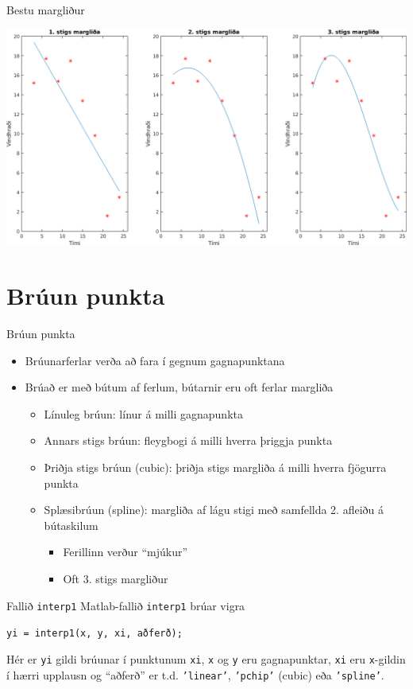 \documentclass[handout]{beamer}
\begin{document}
\begin{frame}[fragile]{Bestu margliður}
\begin{center}
\includegraphics[height=0.6\textheight]{Pics/poly-subplot}
\end{center}
\end{frame}


\section{Brúun punkta}

\begin{frame}[fragile]{Brúun punkta}
\begin{itemize}
 \item Brúunarferlar verða að fara í gegnum gagnapunktana
 \item Brúað er með bútum af ferlum, bútarnir eru oft ferlar margliða
 \begin{itemize}
  \item Línuleg brúun: línur á milli gagnapunkta
  \item Annars stigs brúun:  fleygbogi á milli hverra þriggja punkta
  \item Þriðja stigs brúun (cubic):  þriðja stigs margliða á milli hverra fjögurra punkta
  \item Splæsibrúun (spline): margliða af lágu stigi með samfellda 2. afleiðu á bútaskilum
  \begin{itemize}
   \item Ferillinn verður ``mjúkur''
   \item Oft 3. stigs margliður
  \end{itemize}
 \end{itemize}
\end{itemize}
\end{frame}

\begin{frame}[fragile]{Fallið \texttt{interp1}}
Matlab-fallið \texttt{interp1} brúar vigra
\begin{center}
\texttt{yi = interp1(x, y, xi, aðferð);}
\end{center}
Hér er \texttt{yi} gildi brúunar í punktunum \texttt{xi}, \texttt{x} og \texttt{y} eru gagnapunktar, \texttt{xi} eru \texttt{x}-gildin í hærri upplausn og ``aðferð'' er t.d.  \texttt{'linear'}, \texttt{'pchip'} (cubic) eða \texttt{'spline'}.
\end{frame}
\end{document}

